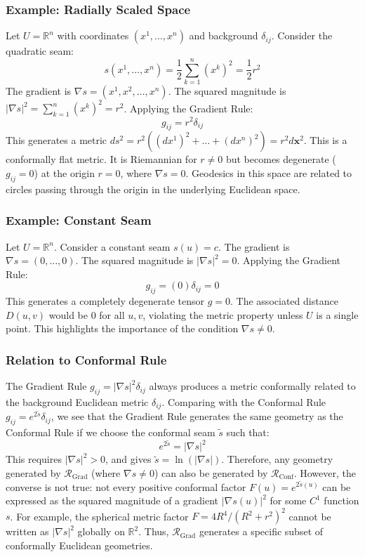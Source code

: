 \documentclass[twoside,twocolumn]{article}
\begin{document}
\subsubsection{Example: Radially Scaled Space}
Let $U = \mathbb{R}^n$ with coordinates $(x^1, \dots, x^n)$ and background $\delta_{ij}$. Consider the quadratic seam:
$$ s(x^1, \dots, x^n) = \frac{1}{2} \sum_{k=1}^n (x^k)^2 = \frac{1}{2} r^2 $$
The gradient is $\nabla s = (x^1, x^2, \dots, x^n)$. The squared magnitude is $|\nabla s|^2 = \sum_{k=1}^n (x^k)^2 = r^2$. Applying the Gradient Rule:
$$ g_{ij} = r^2 \delta_{ij} $$
This generates a metric $ds^2 = r^2 ( (dx^1)^2 + \dots + (dx^n)^2 ) = r^2 d\mathbf{x}^2$. This is a conformally flat metric. It is Riemannian for $r \neq 0$ but becomes degenerate ($g_{ij}=0$) at the origin $r=0$, where $\nabla s = 0$. Geodesics in this space are related to circles passing through the origin in the underlying Euclidean space.

\subsubsection{Example: Constant Seam}
Let $U = \mathbb{R}^n$. Consider a constant seam $s(u) = c$.
The gradient is $\nabla s = (0, \dots, 0)$. The squared magnitude is $|\nabla s|^2 = 0$. Applying the Gradient Rule:
$$ g_{ij} = (0) \delta_{ij} = 0 $$
This generates a completely degenerate tensor $g=0$. The associated distance $D(u, v)$ would be 0 for all $u, v$, violating the metric property unless $U$ is a single point. This highlights the importance of the condition $\nabla s \neq 0$.

\subsubsection{Relation to Conformal Rule}
The Gradient Rule $g_{ij} = |\nabla s|^2 \delta_{ij}$ always produces a metric conformally related to the background Euclidean metric $\delta_{ij}$. Comparing with the Conformal Rule $g_{ij} = e^{2\tilde{s}} \delta_{ij}$, we see that the Gradient Rule generates the same geometry as the Conformal Rule if we choose the conformal seam $\tilde{s}$ such that:
$$ e^{2\tilde{s}} = |\nabla s|^2 $$
This requires $|\nabla s|^2 > 0$, and gives $\tilde{s} = \ln(|\nabla s|)$. Therefore, any geometry generated by $\mathcal{R}_{\text{Grad}}$ (where $\nabla s \neq 0$) can also be generated by $\mathcal{R}_{\text{Conf}}$. However, the converse is not true: not every positive conformal factor $F(u) = e^{2\tilde{s}(u)}$ can be expressed as the squared magnitude of a gradient $|\nabla s(u)|^2$ for some $C^1$ function $s$. For example, the spherical metric factor $F = 4R^4 / (R^2+r^2)^2$ cannot be written as $|\nabla s|^2$ globally on $\mathbb{R}^2$. Thus, $\mathcal{R}_{\text{Grad}}$ generates a specific subset of conformally Euclidean geometries.
\end{document}
